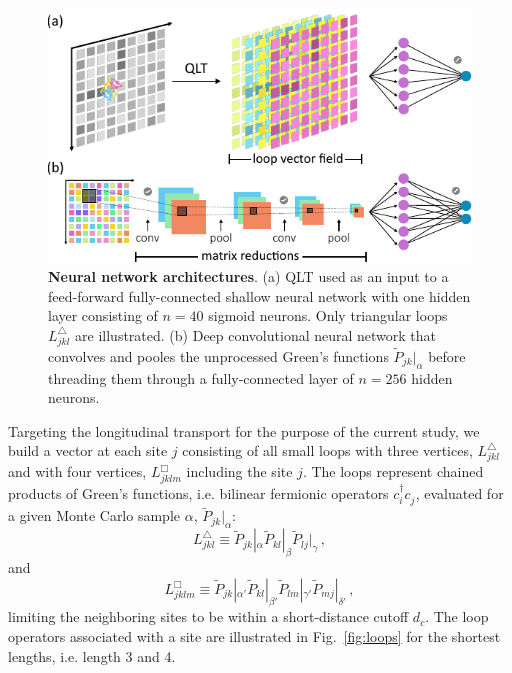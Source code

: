 \documentclass[amsmath,amssymb, aps, prx, longbibliography, twocolumn]{revtex4-1}
\begin{document}
\begin{figure}[t]
    \centering
    \includegraphics[scale=.85]{architecture.pdf}
    \caption{{\bf Neural network architectures}. 
    			(a) QLT used as an input to a feed-forward fully-connected shallow neural network with one hidden layer 
			consisting of $n=40$ sigmoid neurons. Only triangular loops $ L^\triangle_{jkl}$ are illustrated.
    			(b) Deep convolutional neural network that convolves and pooles the unprocessed Green's functions 
				$\widetilde{P}_{jk}|_{\alpha}$ before threading them through a fully-connected layer of $n=256$ hidden neurons.}
    \label{fig:network_architecture}
\end{figure}
Targeting the longitudinal transport for the purpose of the current study, we build a vector at each site $j$ consisting of all small loops with three vertices, $L^\triangle_{jkl}$ and with four vertices, $L^\Box_{jklm}$ including the site $j$. The loops represent
chained products of Green's functions, i.e. bilinear fermionic operators  $c_i^\dagger c_j^{\phantom\dagger}$, evaluated for a given Monte Carlo sample 
$\alpha$, $\widetilde{P}_{jk}|_{\alpha}$:
\begin{equation}
    L^\triangle_{jkl}\equiv\widetilde{P}_{jk}|_{\alpha} \widetilde{P}_{kl}|_{\beta} \widetilde{P}_{lj}|_{\gamma} \,,
    \label{eq:triangle}
\end{equation}
and 
\begin{equation}
L^\Box_{jklm}\equiv\widetilde{P}_{jk}|_{\alpha'} \widetilde{P}_{kl}|_{\beta'} \widetilde{P}_{lm}|_{\gamma'} \widetilde{P}_{mj}|_{\delta'} \,,
\label{eq:quad}
\end{equation}
limiting the neighboring sites to be within a short-distance cutoff $d_c$. 
The loop operators associated with a site are illustrated in Fig.~\ref{fig:loops} for the shortest lengths, i.e. length 3 and 4.
\end{document}
